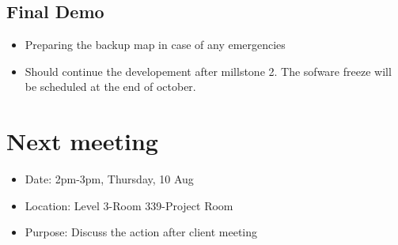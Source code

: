 \documentclass[11pt, a4paper]{article}
\begin{document}
\subsection{Final Demo}
\begin{itemize}
	\item Preparing the backup map in case of any emergencies
	\item Should continue the developement after millstone 2. The sofware freeze will be scheduled at the end of october.
\end{itemize}





\section{Next meeting}
\begin{itemize}
\item Date: 2pm-3pm, Thursday, 10 Aug
\item Location: Level 3-Room 339-Project Room
\item Purpose: Discuss the action after client meeting
\end{itemize}

\vspace*{10pt}
\end{document}
